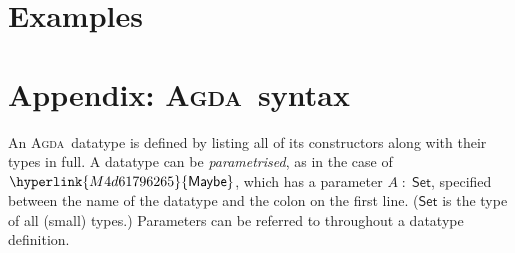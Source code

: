 \documentclass[fleqn]{llncs}
\newcommand{\identifier}[1]{\mathit{#1}}
\newcommand{\constructor}[1]{\mathsf{#1}}
\newcommand{\Agda}{\textsc{Agda}}
\begin{document}

\section{Examples}
\label{sec:examples}









\newpage

\section*{Appendix: \Agda\ syntax}

An \Agda\ datatype is defined by listing all of its constructors along with their types in full.
A datatype can be \emph{parametrised}, as in the case of \ensuremath{\protect\hyperlink{M4d61796265}{\constructor{Maybe}}}, which has a parameter \ensuremath{\identifier{A}\;{:}\;\constructor{Set}}, specified between the name of the datatype and the colon on the first line.
(\ensuremath{\constructor{Set}} is the type of all (small) types.)
Parameters can be referred to throughout a datatype definition.
\end{document}

